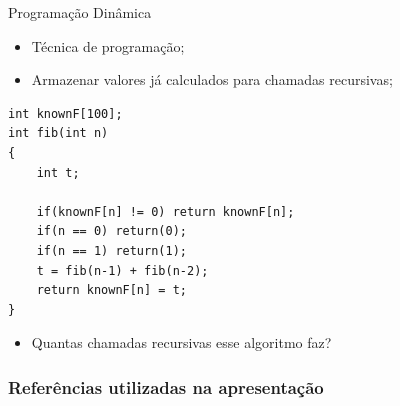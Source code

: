 \documentclass{beamer}
\begin{document}
	\begin{frame}[fragile,c]{Programação Dinâmica}
		\begin{itemize}
			\item Técnica de programação;
			\item Armazenar valores já calculados para chamadas recursivas;
		\end{itemize}
		\begin{verbatim}
int knownF[100];
int fib(int n)
{
	int t;

	if(knownF[n] != 0) return knownF[n];
	if(n == 0) return(0);
	if(n == 1) return(1);
	t = fib(n-1) + fib(n-2);
	return knownF[n] = t;
}
		\end{verbatim}
		\begin{itemize}
			\item Quantas chamadas recursivas esse algoritmo faz?
		\end{itemize}
	\end{frame}




	\begin{frame}[allowframebreaks]
		\frametitle{Referências utilizadas na apresentação}
		
	\end{frame}
\end{document}
